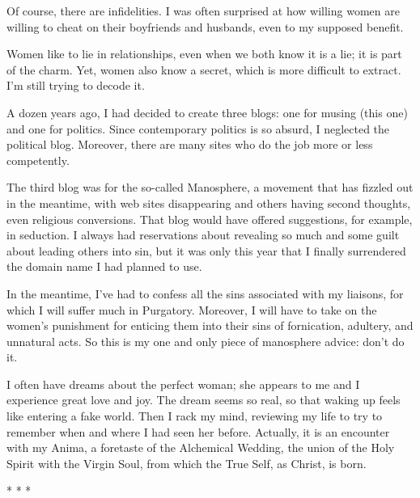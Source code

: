 Of course, there are infidelities. I was often surprised at how willing women are willing to cheat on their boyfriends and husbands, even to my supposed benefit.

Women like to lie in relationships, even when we both know it is a lie; it is part of the charm. Yet, women also know a secret, which is more difficult to extract. I'm still trying to decode it.

A dozen years ago, I had decided to create three blogs: one for musing (this one) and one for politics. Since contemporary politics is so absurd, I neglected the political blog. Moreover, there are many sites who do the job more or less competently.

The third blog was for the so-called Manosphere, a movement that has fizzled out in the meantime, with web sites disappearing and others having second thoughts, even religious conversions. That blog would have offered suggestions, for example, in seduction. I always had reservations about revealing so much and some guilt about leading others into sin, but it was only this year that I finally surrendered the domain name I had planned to use.

In the meantime, I've had to confess all the sins associated with my liaisons, for which I will suffer much in Purgatory. Moreover, I will have to take on the women's punishment for enticing them into their sins of fornication, adultery, and unnatural acts. So this is my one and only piece of manosphere advice: don't do it.

I often have dreams about the perfect woman; she appears to me and I experience great love and joy. The dream seems so real, so that waking up feels like entering a fake world. Then I rack my mind, reviewing my life to try to remember when and where I had seen her before. Actually, it is an encounter with my Anima, a foretaste of the Alchemical Wedding, the union of the Holy Spirit with the Virgin Soul, from which the True Self, as Christ, is born.




\begin{center}* * *\end{center}

